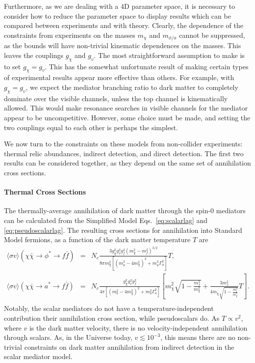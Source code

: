 Furthermore, as we are dealing with a 4D parameter space, it is necessary to consider how to reduce the parameter space to display results which can be compared between experiments and with theory. Clearly, the dependence of the constraints from experiments on the masses $m_\chi$ and $m_{\phi/a}$ cannot be suppressed, as the bounds will have non-trivial kinematic dependences on the masses. This leaves the couplings $g_\chi$ and $g_v$. The most straightforward assumption to make is to set $g_\chi = g_v$. This has the somewhat unfortunate result of making certain types of experimental results appear more effective than others. For example, with $g_\chi = g_v$, we expect the mediator branching ratio to dark matter to completely dominate over the visible channels, unless the top channel is kinematically allowed. This would make resonance searches in visible channels for the mediator appear to be uncompetitive. However, some choice must be made, and setting the two couplings equal to each other is perhaps the simplest.

We now turn to the constraints on these models from non-collider experiments: thermal relic abundances, indirect detection, and direct detection. The first two results can be considered together, as they depend on the same set of annihilation cross sections.

\paragraph{Thermal Cross Sections}

The thermally-average annihilation of dark matter through the spin-0 mediators can be calculated from the Simplified Model Eqs.~\eqref{eq:scalarlag} and \eqref{eq:pseudoscalarlag}. The resulting cross sections for annihilation into Standard Model fermions, as a function of the dark matter temperature $T$ are
\begin{eqnarray*}
\langle \sigma v \rangle(\chi\bar{\chi} \to \phi^* \to f\bar{f}) & = & N_c \frac{3 g_\chi^2 g_v^2 y_f^2 (m_\chi^2 - m_f^2)^{3/2}}{8\pi m_\chi^2\left[ (m_\phi^2 - 4m_\chi^2)^2 + m_\phi^2\Gamma^2_\phi \right]} T, \label{eq:scalarthermal} \\
\langle \sigma v \rangle(\chi\bar{\chi} \to a^* \to f\bar{f}) & = & N_c \frac{g_\chi^2 g_v^2 y_f^2 }{4\pi \left[ (m_a^2 - 4m_\chi^2)^2 + m_a^2\Gamma^2_a \right]} \left[ m_\chi^2 \sqrt{1-\frac{m_f^2}{m_\chi^2}} + \frac{3m_f^2}{4m_\chi \sqrt{1-\frac{m_f^2}{m_\chi^2}}} T \right].  \label{eq:pseudoscalarthermal} \\
\end{eqnarray*}
Notably, the scalar mediators do not have a temperature-independent contribution their annihilation cross section, while pseudoscalars do. As $T \propto v^2$, where $v$ is the dark matter velocity, there is no velocity-independent annihilation through scalars. As, in the Universe today, $v \lesssim 10^{-3}$, this means there are no non-trivial constraints on dark matter annihilation from indirect detection in the scalar mediator model. 

